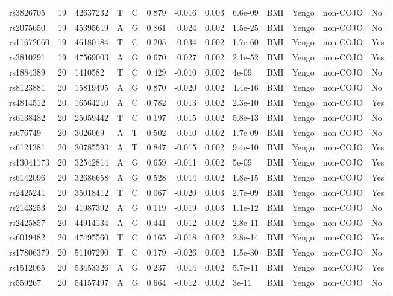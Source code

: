 \documentclass[11pt,twoside]{bristolthesis}
\begin{document}
\begin{longtable}[t]{lrlllrrrlllll}
rs3826705 & 19 & 42637232 & T & C & 0.879 & -0.016 & 0.003 & 6.6e-09 & BMI & Yengo & non-COJO & No\\
rs2075650 & 19 & 45395619 & A & G & 0.861 & 0.024 & 0.002 & 1.5e-25 & BMI & Yengo & non-COJO & No\\
\addlinespace
rs11672660 & 19 & 46180184 & T & C & 0.205 & -0.034 & 0.002 & 1.7e-60 & BMI & Yengo & non-COJO & Yes\\
rs3810291 & 19 & 47569003 & A & G & 0.670 & 0.027 & 0.002 & 2.1e-52 & BMI & Yengo & non-COJO & Yes\\
rs1884389 & 20 & 1410582 & T & C & 0.429 & -0.010 & 0.002 & 4e-09 & BMI & Yengo & non-COJO & No\\
rs8123881 & 20 & 15819495 & A & G & 0.870 & -0.020 & 0.002 & 4.4e-16 & BMI & Yengo & non-COJO & No\\
rs4814512 & 20 & 16564210 & A & C & 0.782 & 0.013 & 0.002 & 2.3e-10 & BMI & Yengo & non-COJO & Yes\\
\addlinespace
rs6138482 & 20 & 25059442 & T & C & 0.197 & 0.015 & 0.002 & 5.8e-13 & BMI & Yengo & non-COJO & No\\
rs676749 & 20 & 3026069 & A & T & 0.502 & -0.010 & 0.002 & 1.7e-09 & BMI & Yengo & non-COJO & No\\
rs6121381 & 20 & 30785593 & A & T & 0.847 & -0.015 & 0.002 & 9.4e-10 & BMI & Yengo & non-COJO & Yes\\
rs13041173 & 20 & 32542814 & A & G & 0.659 & -0.011 & 0.002 & 5e-09 & BMI & Yengo & non-COJO & Yes\\
rs6142096 & 20 & 32686658 & A & G & 0.528 & 0.014 & 0.002 & 1.8e-15 & BMI & Yengo & non-COJO & Yes\\
\addlinespace
rs2425241 & 20 & 35018412 & T & C & 0.067 & -0.020 & 0.003 & 2.7e-09 & BMI & Yengo & non-COJO & Yes\\
rs2143253 & 20 & 41987392 & A & G & 0.119 & -0.019 & 0.003 & 1.1e-12 & BMI & Yengo & non-COJO & No\\
rs2425857 & 20 & 44914134 & A & G & 0.441 & 0.012 & 0.002 & 2.8e-11 & BMI & Yengo & non-COJO & No\\
rs6019482 & 20 & 47495560 & T & C & 0.165 & -0.018 & 0.002 & 2.8e-14 & BMI & Yengo & non-COJO & Yes\\
rs17806379 & 20 & 51107290 & T & C & 0.179 & -0.026 & 0.002 & 1.5e-30 & BMI & Yengo & non-COJO & No\\
\addlinespace
rs1512065 & 20 & 53453326 & A & G & 0.237 & 0.014 & 0.002 & 5.7e-11 & BMI & Yengo & non-COJO & Yes\\
rs559267 & 20 & 54157497 & A & G & 0.664 & -0.012 & 0.002 & 3e-11 & BMI & Yengo & non-COJO & No\\

\end{longtable}
\end{document}
